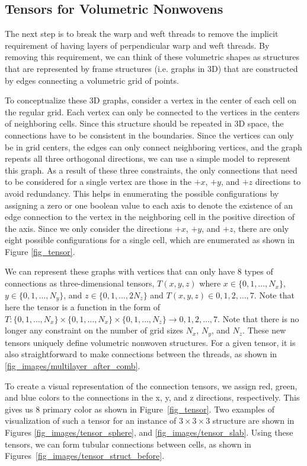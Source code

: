\documentclass[times,twocolumn,final]{elsarticle}
\begin{document}
\subsection{Tensors for Volumetric Nonwovens}

The next step is to break the warp and weft threads to remove the implicit requirement of having layers of perpendicular warp and weft threads. By removing this requirement, we can think of these volumetric shapes as structures that are represented by frame structures (i.e. graphs in 3D) that are constructed by edges connecting a volumetric grid of points. 

To conceptualize these 3D graphs, consider a vertex in the center of each cell on the regular grid. Each vertex can only be connected to the vertices in the centers of neighboring cells.  Since this structure should be repeated in 3D space, the connections have to be consistent in the boundaries. Since the vertices can only be in grid centers, the edges can only connect neighboring vertices, and the graph repeats all three orthogonal directions, we can use a simple model to represent this graph. As a result of these three constraints, the only connections that need to be considered for a single vertex are those in the $+x$, $+y$, and $+z$ directions to avoid redundancy. This helps in enumerating the possible configurations by assigning a zero or one boolean value to each axis to denote the existence of an edge connection to the vertex in the neighboring cell in the positive direction of the axis. Since we only consider the directions $+x$, $+y$, and $+z$, there are only eight possible configurations for a single cell, which are enumerated as shown in Figure \ref{fig_tensor}. 

We can represent these graphs with vertices that can only have $8$ types of connections as three-dimensional tensors, $T(x,y,z)$ where $x \in \{0,1,\ldots,N_x\}$, $y \in \{0,1,\ldots,N_y\}$, and $z \in \{0,1,\ldots,2N_z\}$ and $T(x,y,z) \in {0,1,2,\ldots,7}$. Note that here the tensor is a function in the form of $T: \{0,1,\ldots,N_x\} \times \{0,1,\ldots,N_x\} \times \{0,1,\ldots,N_z\} \longrightarrow {0,1,2,\ldots,7}$. Note that there is no longer any constraint on the number of grid sizes $N_x$, $N_y$, and $N_z$. These new tensors uniquely define volumetric nonwoven structures. For a given tensor, it is also straightforward to make connections between the threads, as shown in \ref{fig_images/multilayer_after_comb}.

To create a visual representation of the connection tensors, we assign red, green, and blue colors to the connections in the x, y, and z directions, respectively. This gives us $8$ primary color as shown in Figure~\ref{fig_tensor}. Two examples of visualization of such a tensor for an instance of $3\times3\times3$ structure are shown in Figures \ref{fig_images/tensor_sphere}, and \ref{fig_images/tensor_slab}. Using these tensors, we can form tubular connections between cells, as shown in Figures~\ref{fig_images/tensor_struct_before}. 
\end{document}
